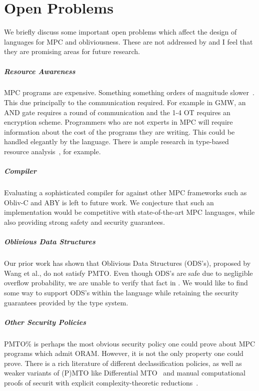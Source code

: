 \chapter{Open Problems}
We briefly discuss some important open problems which affect the design of languages for
MPC and obliviousness. These are not addressed by \lang and I feel that they are promising
areas for future research.

\paragraph{Resource Awareness}
MPC programs are expensive. Something something orders of magnitude slower~\cite{}. This due principally to the communication
required. For example in GMW, an AND gate requires a round of communication and the 1-4 OT requires an encryption scheme.
Programmers who are not experts in MPC will require information about the cost of the programs they are writing. This could be
handled elegantly by the language. There is ample research in type-based resource analysis~\cite{}, for example. 

\paragraph{\lang Compiler}
Evaluating a sophisticated compiler for \lang against other MPC frameworks such as Obliv-C and ABY is left to future work. We conjecture
that such an implementation would be competitive with state-of-the-art MPC languages, while also providing strong safety and security
guarantees.

\paragraph{Oblivious Data Structures}
Our prior work has shown that Oblivious Data Structures (ODS's), proposed by Wang et al., do not satisfy PMTO.
Even though ODS's are safe due to negligible overflow probability, we are unable to verify that fact in \lang. We would like to find some
way to support ODS's within the language while retaining the security guarantees provided by the type system.

\paragraph{Other Security Policies}
PMTO\% is perhaps the most obvious security policy one could prove about MPC programs which admit ORAM. However, it is not the only property
one could prove. There is a rich literature of different declassification policies, as well as weaker variants of (P)MTO like Differential
MTO~\cite{} and manual computational proofs of securit with explicit complexity-theoretic reductions~\cite{easycrypt}.

